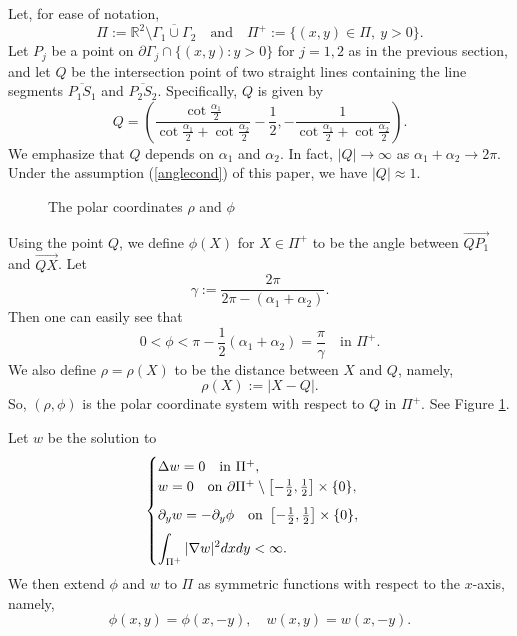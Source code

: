 \documentclass[11pt,a4paper]{article}
\numberwithin{equation}{section}
\def\nm{\noalign{\medskip}}
\newcommand{\ds}{\displaystyle}
\newcommand{\p}{\partial}
\newcommand{\eqnref}[1]{(\ref {#1})}
\newcommand{\Rbb}{\mathbb{R}}
\newcommand{\Ga}{\alpha}
\newcommand{\Gf}{\phi}
\newcommand{\Gg}{\gamma}
\newcommand{\Gr}{\rho}
\newcommand{\GD}{\Delta}
\newcommand{\GG}{\Gamma}
\newcommand{\beq}{\begin{equation}}
\newcommand{\eeq}{\end{equation}}
\begin{document}
Let, for ease of notation,
\beq
\Pi:= \Rbb^2 \setminus \overline {\GG_1 \cup \GG_2} \quad\mbox{and}\quad \Pi^+:= \{ (x,y)\in \Pi, ~y>0 \}.
\eeq
Let $P_j$ be a point on $\p\GG_j \cap \{ (x,y): y>0 \}$ for $j=1,2$ as in the previous section,
and let $Q$ be the intersection point of two straight lines containing the line segments $\overline{P_1 S_1}$ and $\overline{P_2 S_2}$. Specifically, $Q$ is given by
\beq\label{Qdef}
Q= \left(\frac {\cot \frac {\Ga_1} 2}{ \cot \frac {\Ga_1} 2 + \cot \frac {\Ga_2} 2  }- \frac 1 2, -\frac 1 { \cot   \frac {\Ga_1} 2 + \cot   \frac {\Ga_2} 2  } \right).
\eeq
We emphasize that $Q$ depends on $\Ga_1$ and $\Ga_2$. In fact, $|Q| \to \infty$ as $\Ga_1+\Ga_2 \to 2\pi$. Under the assumption \eqnref{anglecond} of this paper, we have $|Q| \approx 1$.

\begin{figure}[h!]
\begin{center}
\end{center}
\caption{The polar coordinates $\Gr$ and $\Gf$}\label{Fig3}
\end{figure}


Using the point $Q$, we define $\Gf(X)$ for $X \in \Pi^+$ to be the angle between $\overrightarrow {Q P_1}$ and $\overrightarrow {QX}$. Let
\beq\label{Ggdef}
\Gg := \frac {2\pi} {2\pi - (\Ga_1 +\Ga_2)}.
\eeq
Then one can easily see that
$$
0 < \Gf < \pi - \frac 1 2 (\Ga_1 + \Ga_2) = \frac{\pi}{\Gg} \quad\mbox{in } \Pi^+.
$$
We also define $\Gr=\Gr(X)$ to be the distance between $X$ and $Q$, namely,
\beq
\Gr(X):= |X-Q|.
\eeq
So, $(\Gr, \Gf)$ is the polar coordinate system with respect to $Q$ in $\Pi^+$. See Figure \ref{Fig3}.


Let $w$ be the solution to
\beq\label{wcondi}
\begin{cases}
\GD w = 0 \quad\mbox{in }  \Pi^+, \\
w= 0  \quad\mbox{on } \p\Pi^+ \setminus \left[-\frac 1 2 , \frac 1 2 \right]\times \{0\} ,  \\
\nm
\p_{y} w =  - \p_{y} \Gf \quad\mbox{on } \left[-\frac 1 2 , \frac 1 2 \right]\times \{0\} ,\\
\nm
\ds \int_{\Pi^+} |\nabla w|^2 dxdy < \infty .  \end{cases}
\eeq
We then extend $\Gf$ and $w$ to $\Pi$ as symmetric functions with respect to the $x$-axis, namely,
$$
\Gf(x,y) = \Gf(x,-y), \quad w(x,y) = w (x,-y).
$$
\end{document}
